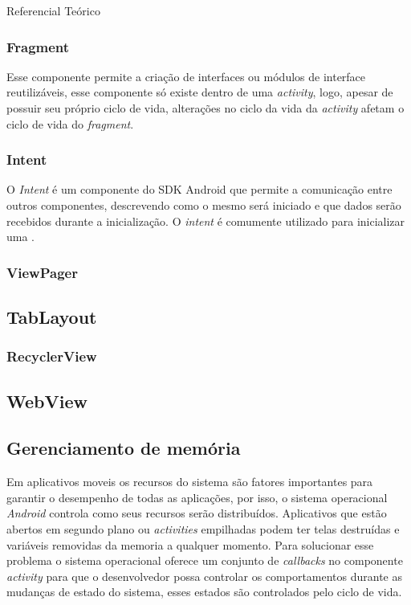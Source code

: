 \documentclass[
	12pt,				%
	openright,			%
	twoside,			%
	a4paper,			%
	english,			%
	french,				%
	spanish,			%
	brazil				%
	]{abntex2}
\begin{document}
\begin{chapter}{Referencial Teórico}
\subsubsection{Fragment} \label{fragment}
Esse componente permite a criação de interfaces ou módulos de interface reutilizáveis, esse componente só existe dentro de uma \textit{activity}, logo, apesar de possuir seu próprio ciclo de vida, alterações no ciclo da vida da \textit{activity} afetam o ciclo de vida do \textit{fragment}.  

\subsubsection{Intent} \label{Intent}
O \textit{Intent} é um componente do SDK Android que permite a comunicação entre outros componentes, descrevendo como o mesmo será iniciado e que dados serão recebidos durante a inicialização. O \textit{intent} é comumente utilizado para inicializar uma .

\subsubsection{ViewPager} \label{ViewPager}

\subsection{TabLayout} \label{TabLayout}

\subsubsection{RecyclerView} \label{RecyclerView}

\subsection{WebView} \label{WebView}

\subsection{Gerenciamento de memória}
Em aplicativos moveis os recursos do sistema são fatores importantes para garantir o desempenho de todas as aplicações, por isso, o sistema operacional \textit{Android} controla como seus recursos serão distribuídos. Aplicativos que estão abertos em segundo plano ou \textit{activities} empilhadas podem ter telas destruídas e variáveis removidas da memoria a qualquer momento. Para solucionar esse problema o sistema operacional oferece um conjunto de \textit{callbacks} no componente \textit{activity} para que o desenvolvedor possa controlar os comportamentos durante as mudanças de estado do sistema, esses estados são controlados pelo ciclo de vida.


\end{chapter}
\end{document}
